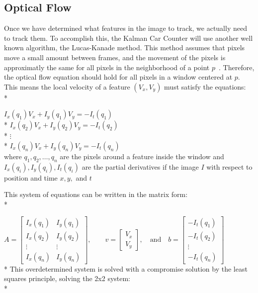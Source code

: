 \documentclass[draft]{article} %
\begin{document}
\subsection{Optical Flow}
Once we have determined what features in the image to track, we actually need to track them. To accomplish this, the Kalman Car Counter will use another well known algorithm, the Lucas-Kanade method. This method assumes that pixels move a small amount between frames, and the movement of the pixels is approximatly the same for all pixels in the neighborhood of a point $p$~\cite{lucas1981iterative}. Therefore, the optical flow equation should hold for all pixels in a window centered at $p$. This means the local velocity of a feature $(V_x,V_y)$ must satisfy the equations:\\*

{\centering
$I_x(q_1) V_x + I_y (q_1) V_y = -I_t(q_1)$\\*
$I_x(q_2) V_x + I_y (q_2) V_y = -I_t(q_2)$\\*
$\vdots$\\*
$I_x(q_n) V_x + I_y (q_n) V_y = -I_t(q_n)$\linebreak\newline\\
}
where $q_1,q_2,\dots,q_n$ are the pixels around a feature inside the window and $I_x(q_i),I_y(q_i),I_t(q_i)$ are the partial derivatives if the image $I$ with respect to position and time $x,y,$ and $t$

This system of equations can be written in the matrix form:\\*

{\centering
$A = \begin{bmatrix}
I_x(q_1) & I_y(q_1) \\[10pt]
I_x(q_2) & I_y(q_2) \\[10pt]
\vdots  & \vdots  \\[10pt]
I_x(q_n) & I_y(q_n) 
\end{bmatrix},
\quad\quad
v = 
\begin{bmatrix}
V_x\\[10pt]
V_y
\end{bmatrix},
\quad \mbox{and}\quad
b = 
\begin{bmatrix}
-I_t(q_1) \\[10pt]
-I_t(q_2) \\[10pt]
\vdots  \\[10pt]
-I_t(q_n)
\end{bmatrix}
$\linebreak\newline\\*}
This overdetermined system is solved with a compromise solution by the least squares principle, solving the 2x2 system:\\*
\end{document}
